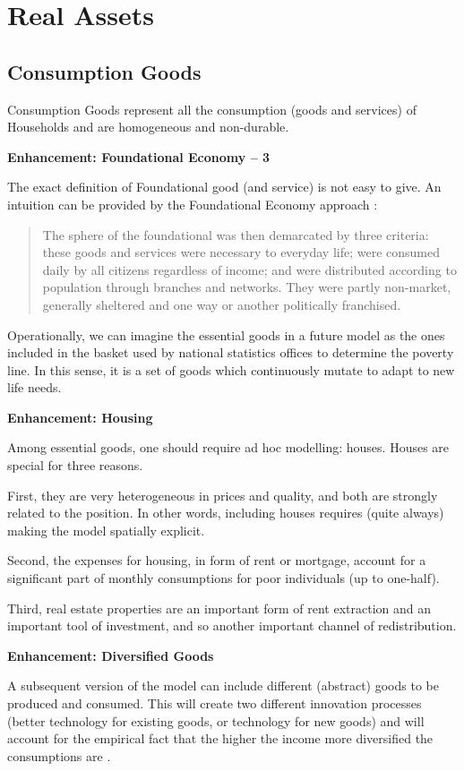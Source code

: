 \documentclass[a4paper, headings=standardclasses]{scrartcl}
\numberwithin{equation}{subsection}
\newenvironment{enh}[1][]{\begin{framed}\noindent\textbf{Enhancement: #1}\par}{\end{framed}}
\begin{document}
\section{Real Assets}
\subsection{Consumption Goods}
Consumption Goods represent all the consumption (goods and services) of Households and are homogeneous and non-durable.

\begin{enh}[Foundational Economy -- 3]
    The exact definition of Foundational good (and service) is not easy to give. An intuition can be provided by the Foundational Economy approach \parencite{arcidiacono2018}: \begin{quote}
        The sphere of the foundational was then demarcated by three criteria: these goods and services were necessary to everyday life; were consumed daily by all citizens regardless of income; and were distributed according to population through branches and networks. They were partly non-market, generally sheltered and one way or another politically franchised.
    \end{quote}

    Operationally, we can imagine the essential goods in a future model as the ones included in the basket used by national statistics offices to determine the poverty line. In this sense, it is a set of goods which continuously mutate to adapt to new life needs.
\end{enh}

\begin{enh}[Housing]
    Among essential goods, one should require ad hoc modelling: houses. Houses are special for three reasons.

    First, they are very heterogeneous in prices and quality, and both are strongly related to the position. In other words, including houses requires (quite always) making the model spatially explicit.

    Second, the expenses for housing, in form of rent or mortgage, account for a significant part of monthly consumptions for poor individuals (up to one-half).

    Third, real estate properties are an important form of rent extraction and an important tool of investment, and so another important channel of redistribution.
\end{enh}

\begin{enh}[Diversified Goods]
    A subsequent version of the model can include different (abstract) goods to be produced and consumed. This will create two different innovation processes (better technology for existing goods, or technology for new goods) and will account for the empirical fact that the higher the income more diversified the consumptions are \parencite[cfr.][§2]{didomenico2022}.
\end{enh}
\end{document}

